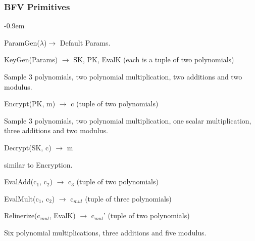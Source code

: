 \documentclass[10pt,handout]{beamer}
\newcommand{\SubItem}[1]{
    {\setlength\itemindent{15pt} \item[-] #1}
}
\begin{document}
\begin{frame}
    \frametitle{BFV Primitives}
\begin{itemize}\itemsep-0.9em
    \item ParamGen($\lambda$)$\rightarrow$ Default Params.
    \item KeyGen(Params) $\rightarrow$ SK, PK, EvalK (each is a tuple of two polynomials)
        \SubItem{ Sample 3 polynomials, two polynomial multiplication, two additions and two modulus.}
\pause
    \item Encrypt(PK, m) $\rightarrow$ c (tuple of two polynomials)
        \SubItem{ Sample 3 polynomials, two polynomial multiplication, one scalar multiplication, three additions and two modulus.}
    \item Decrypt(SK, c) $\rightarrow$ m
        \SubItem{ similar to Encryption.}
\pause
    \item EvalAdd(c$_1$, c$_2$) $\rightarrow$ c$_3$ (tuple of two polynomials)
    \item EvalMult(c$_1$, c$_2$) $\rightarrow$ c$_{mul}$ (tuple of three polynomials)
\pause
    \item Relinerize(c$_{mul}$, EvalK) $\rightarrow$ c$_{mul}$' (tuple of two polynomials)
        \SubItem{ Six polynomial multiplications, three additions and five modulus.}
\end{itemize}


\end{frame}

\end{document}
